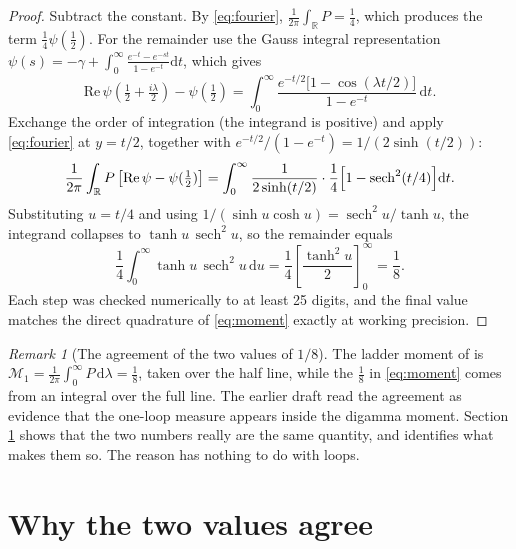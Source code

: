 \documentclass[12pt,a4paper]{article}
\theoremstyle{plain}
\theoremstyle{definition}
\theoremstyle{remark}
\newtheorem{remark}[theorem]{Remark}
\newcommand{\R}{\mathbb{R}}
\newcommand{\dd}{\mathrm{d}}
\begin{document}
\begin{proof}
Subtract the constant. By \eqref{eq:fourier},
$\tfrac{1}{2\pi}\int_\R P=\tfrac14$, which produces the term
$\tfrac14\psi(\tfrac12)$. For the remainder use the Gauss integral
representation
$\psi(s)=-\gamma+\int_0^\infty\frac{e^{-t}-e^{-st}}{1-e^{-t}}\dd t$,
which gives
\begin{equation}
\mathrm{Re}\,\psi\!\left(\tfrac12+\tfrac{i\lambda}{2}\right)-\psi\!\left(\tfrac12\right)
=\int_0^\infty \frac{e^{-t/2}\bigl[1-\cos(\lambda t/2)\bigr]}{1-e^{-t}}\,\dd t .
\end{equation}
Exchange the order of integration (the integrand is positive) and apply
\eqref{eq:fourier} at $y=t/2$, together with
$e^{-t/2}/(1-e^{-t})=1/(2\sinh(t/2))$:
\begin{equation}
\frac{1}{2\pi}\int_\R P\,\bigl[\mathrm{Re}\,\psi-\psi(\tfrac12)\bigr]
=\int_0^\infty\frac{1}{2\sinh(t/2)}\cdot
\frac{1}{4}\Bigl[1-\operatorname{sech}^2(t/4)\Bigr]\dd t .
\end{equation}
Substituting $u=t/4$ and using
$1/(\sinh u\cosh u)=\operatorname{sech}^2u/\tanh u$, the integrand
collapses to $\tanh u\,\operatorname{sech}^2u$, so the remainder equals
\begin{equation}
\frac14\int_0^\infty \tanh u\,\operatorname{sech}^2u\,\dd u
=\frac14\left[\frac{\tanh^2u}{2}\right]_0^\infty=\frac18 .
\end{equation}
Each step was checked numerically to at least 25 digits, and the final
value matches the direct quadrature of \eqref{eq:moment} exactly at
working precision.
\end{proof}

\begin{remark}[The agreement of the two values of $1/8$]
\label{rem:coincidence}
The ladder moment of \cite{ToupinSpectral} is
$\mathcal M_1=\tfrac{1}{2\pi}\int_0^\infty P\,\dd\lambda=\tfrac18$,
taken over the half line, while the $\tfrac18$ in \eqref{eq:moment}
comes from an integral over the full line. The earlier draft read the
agreement as evidence that the one-loop measure appears inside the
digamma moment. Section \ref{sec:resolved} shows that the two numbers
really are the same quantity, and identifies what makes them so. The
reason has nothing to do with loops.
\end{remark}

\section{Why the two values agree}
\label{sec:resolved}
\end{document}
